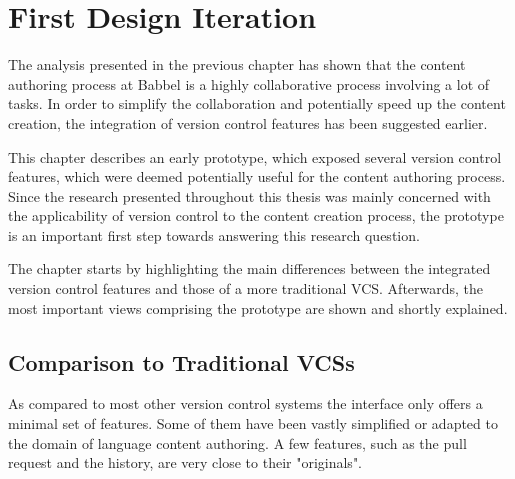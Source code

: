 \chapter{First Design Iteration} \label{chapter:design-first-iteration}
The analysis presented in the previous chapter has shown that the content authoring process at Babbel is a highly collaborative process involving a lot of tasks. In order to simplify the collaboration and potentially speed up the content creation, the integration of version control features has been suggested earlier.

This chapter describes an early prototype, which exposed several version control features, which were deemed potentially useful for the content authoring process. Since the research presented throughout this thesis was mainly concerned with the applicability of version control to the content creation process, the prototype is an important first step towards answering this research question.

The chapter starts by highlighting the main differences between the integrated version control features and those of a more traditional VCS. Afterwards, the most important views comprising the prototype are shown and shortly explained.

\section{Comparison to Traditional VCSs} \label{sec:git-feature-comparison}
As compared to most other version control systems the interface only offers a minimal set of features. Some of them have been vastly simplified or adapted to the domain of language content authoring. A few features, such as the pull request and the history, are very close to their "originals".

